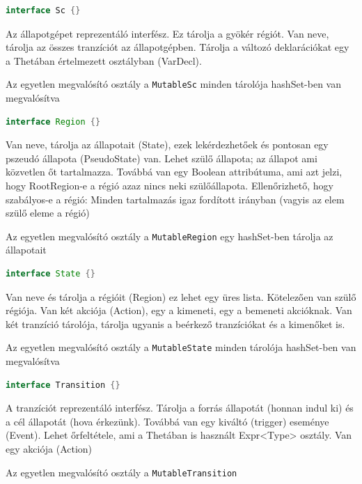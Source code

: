 \begin{lstlisting}[language=java,breaklines=true]
interface Sc {}
\end{lstlisting}

Az állapotgépet reprezentáló interfész. Ez tárolja a gyökér régiót. Van neve, tárolja az összes tranzíciót az állapotgépben. Tárolja a változó deklarációkat egy a Thetában értelmezett osztályban (VarDecl). 

Az egyetlen megvalósító osztály a \verb+MutableSc+ minden tárolója hashSet-ben van megvalósítva

\begin{lstlisting}[language=java,breaklines=true]
interface Region {}
\end{lstlisting}

Van neve, tárolja az állapotait (State), ezek lekérdezhetőek és pontosan egy pszeudó állapota (PseudoState) van. Lehet szülő állapota; az állapot ami közvetlen őt tartalmazza. Továbbá van egy Boolean attribútuma, ami azt jelzi, hogy RootRegion-e a régió azaz nincs neki szülőállapota. Ellenőrizhető, hogy szabályos-e a régió: Minden tartalmazás igaz fordított irányban (vagyis az elem szülő eleme a régió)

Az egyetlen megvalósító osztály a \verb+MutableRegion+ egy hashSet-ben tárolja az állapotait

\begin{lstlisting}[language=java,breaklines=true]
interface State {}
\end{lstlisting}

Van neve és tárolja a régióit (Region) ez lehet egy üres lista. Kötelezően van szülő régiója. Van két akciója (Action), egy a kimeneti, egy a bemeneti akcióknak. Van két tranzíció tárolója, tárolja ugyanis a beérkező tranzíciókat és a kimenőket is.

Az egyetlen megvalósító osztály a \verb+MutableState+ minden tárolója hashSet-ben van megvalósítva

\begin{lstlisting}[language=java,breaklines=true]
interface Transition {}
\end{lstlisting}

A tranzíciót reprezentáló interfész. Tárolja a forrás állapotát (honnan indul ki) és a cél állapotát (hova érkezünk). Továbbá van egy kiváltó (trigger) eseménye (Event). Lehet őrfeltétele, ami a Thetában is használt Expr<Type> osztály. Van egy akciója (Action)

Az egyetlen megvalósító osztály a \verb+MutableTransition+

